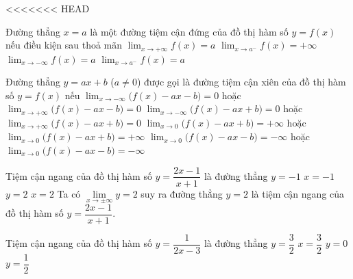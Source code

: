 <<<<<<< HEAD
\boxde
\BTTN
\begin{ex}%
 Đường thẳng $x = a$ là một đường tiệm cận đứng của
 đồ thị hàm số $ y = f (x)$ nếu điều kiện sau thoả mãn
 \choice
 {$\displaystyle\lim_{x\to +\infty }f(x)=a$}
 {\True $\displaystyle\lim_{x\to a^-}f(x)=+\infty $}
 {$\displaystyle\lim_{x\to -\infty }f(x)=a$}
 {$\displaystyle\lim_{x\to a^-}f(x)=a $}
\end{ex}
\begin{ex}%
 Đường thẳng $y = ax + b$ ($a \neq 0$) được gọi là đường tiệm cận xiên của đồ thị hàm số $y = f(x)$ nếu
 \choice
 {\True $\displaystyle\lim_{x\to -\infty }\big(f(x)-ax-b\big)=0$ hoặc $\displaystyle\lim_{x\to +\infty }\big(f(x)-ax-b\big)=0$}
 {$\displaystyle\lim_{x\to -\infty }\big(f(x)-ax+b\big)=0$ hoặc $\displaystyle\lim_{x\to +\infty }\big(f(x)-ax+b\big)=0$}
 {$\displaystyle\lim_{x\to 0 }\big(f(x)-ax+b\big)=+\infty$ hoặc $\displaystyle\lim_{x\to 0 }\big(f(x)-ax+b\big)=+\infty$}
 {$\displaystyle\lim_{x\to 0 }\big(f(x)-ax-b\big)=-\infty$ hoặc $\displaystyle\lim_{x\to 0 }\big(f(x)-ax-b\big)=-\infty$}
\end{ex}
\begin{ex}
 Tiệm cận ngang của đồ thị hàm số $ y=\dfrac{2x-1}{x+1} $ là đường thẳng
 \choice
 {$y=-1$}
 {$ x=-1 $}
 {\True $ y=2 $}
 {$ x=2 $}
 \loigiai
 {
 Ta có $ \lim\limits_{x\to \pm\infty}y=2$ suy ra đường thẳng $ y=2 $ là tiệm cận ngang của đồ thị hàm số $ y=\dfrac{2x-1}{x+1} $.
 }
\end{ex}
\begin{ex}
 Tiệm cận ngang của đồ thị hàm số $y=\dfrac{1}{2x-3}$ là đường thẳng
 \choice
 {$y=\dfrac{3}{2}$}
 {$x=\dfrac{3}{2}$}
 {\True $y=0$}
 {$y=\dfrac{1}{2}$}
\end{ex}
